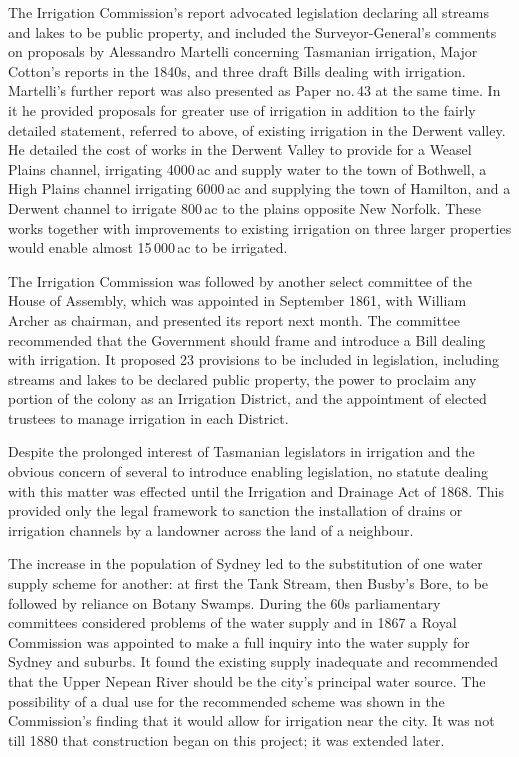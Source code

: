 The Irrigation Commission's report advocated legislation declaring all
str\-eams and lakes to be public property, and included the
Surveyor-General's comments on proposals by Alessandro Martelli
concerning Tasmanian irrigation, Major Cotton's reports in the 1840s,
and three draft Bills dealing with irrigation.  Martelli's further
report was also presented as Paper no.\,43 at the same time.  In it he
provided proposals for greater use of irrigation in addition to the
fairly detailed statement, referred to above, of existing irrigation
in the Derwent valley.  He detailed the cost of works in the Derwent
Valley to provide for a Weasel Plains channel, irrigating 4000\,ac and
supply water to the town of Bothwell, a High Plains channel irrigating
6000\,ac and supplying the town of Hamilton, and a Derwent channel to
irrigate 800\,ac to the plains opposite New Norfolk.  These works
together with improvements to existing irrigation on three larger
properties would enable almost 15\,000\,ac to be irrigated.

The Irrigation Commission was followed by another select committee of
the House of Assembly, which was appointed in September 1861, with
William Archer as chairman, and presented its report next month.  The
committee recommended that the Government should frame and introduce a
Bill dealing with irrigation. It proposed 23 provisions to be included
in legislation, including streams and lakes to be declared public
property, the power to proclaim any portion of the colony as an
Irrigation District, and the appointment of elected trustees to manage
irrigation in each District.\fn{Tas.\ HA Paper no.\,112 of 1861.}

Despite the prolonged interest of Tasmanian legislators in irrigation
and the obvious concern of several to introduce enabling legislation,
no statute dealing with this matter was effected until the Irrigation
and Drainage Act of 1868.  This provided only the legal framework to
sanction the installation of drains or irrigation channels by a
landowner across the land of a
neighbour.

The increase in the population of Sydney led to the substitution of
one water supply scheme for another: at first the Tank Stream, then
Busby's Bore, to be followed by reliance on Botany Swamps.  During the
60s parliamentary committees considered problems of the water supply
and in 1867 a Royal Commission was appointed to make a full inquiry
into the water supply for Sydney and suburbs.  It found the existing
supply inadequate and recommended that the Upper Nepean River should
be the city's principal water source.  The possibility of a dual use
for the recommended scheme was shown in the Commission's finding that
it would allow for irrigation near the city.  It was not till 1880
that construction began on this project; it was extended
later.

